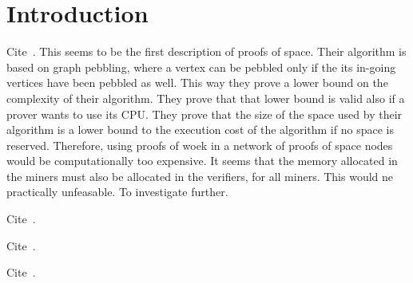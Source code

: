 \section{Introduction}\label{sec:introduction}

Cite~\cite{DziembowskiFKP15}. This seems to be the first description of proofs of space.
Their algorithm is based on graph pebbling, where a vertex can be pebbled only if the
its in-going vertices have been pebbled as well. This way they prove a lower bound on the
complexity of their algorithm. They prove that that lower bound is valid also if a prover
wants to use its CPU. They prove that the size of the space used by their algorithm
is a lower bound to the execution cost of the algorithm if no space is reserved.
Therefore, using proofs of woek in a network of proofs of space nodes would
be computationally too expensive. It seems that the memory allocated in the miners
must also be allocated in the verifiers, for all miners. This would ne practically unfeasable.
To investigate further.

Cite~\cite{AtenieseBFG14}.

Cite~\cite{TangZDWLG0L19}.

Cite~\cite{RenD16}.

